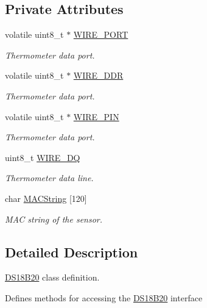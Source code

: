 \subsection*{Private Attributes}
\begin{DoxyCompactItemize}
\item 
volatile uint8\+\_\+t $\ast$ \hyperlink{classSensors_1_1DS18B20_a6a769e836e36f4975918eb52f6e00309}{W\+I\+R\+E\+\_\+\+P\+O\+RT}
\begin{DoxyCompactList}\small\item\em Thermometer data port. \end{DoxyCompactList}\item 
volatile uint8\+\_\+t $\ast$ \hyperlink{classSensors_1_1DS18B20_aceb52cdfb7462c8c7be8178181ae4dc5}{W\+I\+R\+E\+\_\+\+D\+DR}
\begin{DoxyCompactList}\small\item\em Thermometer data port. \end{DoxyCompactList}\item 
volatile uint8\+\_\+t $\ast$ \hyperlink{classSensors_1_1DS18B20_ada7da2f14ca56ef0598caedd5c96ea7a}{W\+I\+R\+E\+\_\+\+P\+IN}
\begin{DoxyCompactList}\small\item\em Thermometer data port. \end{DoxyCompactList}\item 
uint8\+\_\+t \hyperlink{classSensors_1_1DS18B20_a10fe94bdfb9a37a86d34925534a4547c}{W\+I\+R\+E\+\_\+\+DQ}
\begin{DoxyCompactList}\small\item\em Thermometer data line. \end{DoxyCompactList}\item 
char \hyperlink{classSensors_1_1DS18B20_a7c33b18028020215b85039dd9555a6df}{M\+A\+C\+String} \mbox{[}120\mbox{]}
\begin{DoxyCompactList}\small\item\em M\+AC string of the sensor. \end{DoxyCompactList}\end{DoxyCompactItemize}


\subsection{Detailed Description}
\hyperlink{classSensors_1_1DS18B20}{D\+S18\+B20} class definition. 

Defines methods for accessing the \hyperlink{classSensors_1_1DS18B20}{D\+S18\+B20} interface 

